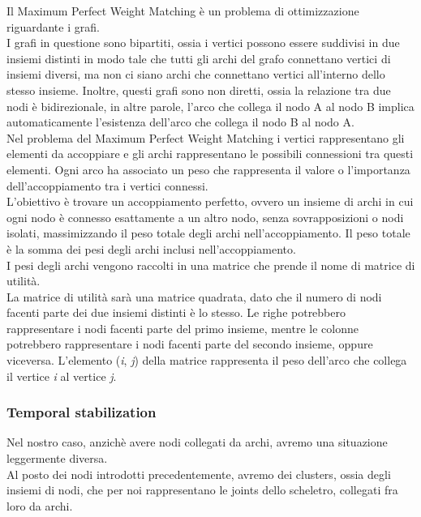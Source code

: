  Il Maximum Perfect Weight Matching è un problema di ottimizzazione riguardante i grafi. \\
 I grafi in questione sono bipartiti, ossia i vertici possono essere suddivisi in due insiemi distinti in
modo tale che tutti gli archi del grafo connettano vertici di insiemi diversi, ma non ci siano archi che connettano vertici all’interno dello stesso insieme.
Inoltre, questi grafi sono non diretti, ossia la relazione tra due nodi è bidirezionale, in altre parole, l'arco che collega il nodo A al nodo B implica automaticamente l'esistenza dell'arco che collega il nodo B al nodo A. \\
Nel problema del Maximum Perfect Weight Matching i vertici rappresentano gli elementi da accoppiare e gli archi rappresentano le possibili connessioni tra questi elementi. Ogni arco ha associato un peso che rappresenta il valore o l'importanza dell'accoppiamento tra i vertici connessi. \\
 L'obiettivo è trovare un accoppiamento perfetto, ovvero un insieme di archi in cui ogni nodo è connesso esattamente a un altro nodo, senza sovrapposizioni o nodi isolati, massimizzando il peso totale degli archi nell'accoppiamento.
 Il peso totale è la somma dei pesi degli archi inclusi nell'accoppiamento. \\
 I pesi degli archi vengono raccolti in una matrice che prende il nome di matrice di utilità. \\
 La matrice di utilità sarà una matrice quadrata, dato che il numero di nodi facenti parte dei due insiemi distinti è lo stesso.
Le righe potrebbero rappresentare i nodi facenti parte del primo insieme, mentre le colonne potrebbero rappresentare i nodi facenti parte del secondo insieme, oppure viceversa.
 L'elemento (\textit{i}, \textit{j}) della matrice rappresenta il peso dell'arco che collega il vertice \textit{i} al vertice \textit{j}.
 


\subsubsection{Temporal stabilization}
Nel nostro caso, anzichè avere nodi collegati da archi, avremo una situazione leggermente diversa. \\   
Al posto dei nodi introdotti precedentemente, avremo dei clusters, ossia degli insiemi di nodi, che per noi rappresentano le joints dello scheletro, collegati fra loro da archi.
\\  

